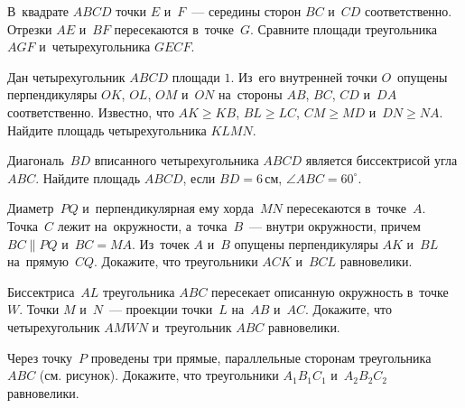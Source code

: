 



\begin{problems}

\item
В~квадрате $ABCD$ точки $E$ и~$F$~--- середины сторон $BC$ и~$CD$
соответственно.
Отрезки $AE$ и~$BF$ пересекаются в~точке~$G$.
Сравните площади треугольника $AGF$ и~четырехугольника $GECF$.

\item
Дан четырехугольник $ABCD$ площади $1$.
Из~его внутренней точки $O$~опущены перпендикуляры $OK$, $OL$, $OM$ и~$ON$
на~стороны $AB$, $BC$, $CD$ и~$DA$ соответственно.
Известно, что $AK \geq KB$, $BL \geq LC$, $CM \geq MD$ и~$DN \geq NA$.
Найдите площадь четырехугольника $KLMN$.

\item
Диагональ~$BD$ вписанного четырехугольника $ABCD$ является биссектрисой
угла $ABC$.
Найдите площадь $ABCD$, если $BD = 6\,\text{см}$, $\angle ABC = 60^{\circ}$.

\item
Диаметр~$PQ$ и~перпендикулярная ему хорда~$MN$ пересекаются в~точке~$A$.
Точка~$C$ лежит на~окружности, а~точка~$B$~--- внутри окружности, причем
$BC \parallel PQ$ и~$BC = MA$.
Из~точек $A$ и~$B$ опущены перпендикуляры $AK$ и~$BL$ на~прямую~$CQ$.
Докажите, что треугольники $ACK$ и~$BCL$ равновелики.

\item
Биссектриса~$AL$ треугольника $ABC$ пересекает описанную окружность
в~точке~$W$.
Точки $M$ и~$N$~--- проекции точки~$L$ на~$AB$ и~$AC$.
Докажите, что четырехугольник $AMWN$ и~треугольник $ABC$ равновелики.

\item
\begin{minipage}[t][][t]{0.77\linewidth}
Через точку~$P$ проведены три прямые, параллельные сторонам треугольника $ABC$
(см. рисунок).
Докажите, что треугольники $A_{1}B_{1}C_{1}$ и~$A_{2}B_{2}C_{2}$ равновелики.
\end{minipage}\hfill
\begin{minipage}[t][][b]{0.20\linewidth}
    \vspace{-3ex}%
    \hspace{-0.3\linewidth}\hfill{}
\end{minipage}


\end{problems}
